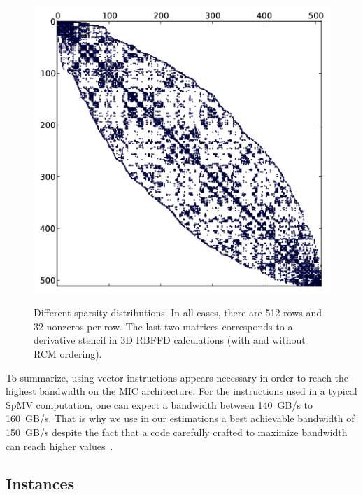 \documentclass{sig-alternate}
\begin{document}
\begin{figure}[t]
\begin{center}
{      \includegraphics[width=\ww]{figures/kd-tree-3d-rcm-crop.png}}%
  \end{center}
  
  \caption{Different sparsity distributions. In all cases, there are
    512 rows and 32 nonzeros per row. The last two matrices
    corresponds to a derivative stencil in 3D RBFFD
    calculations (with and without RCM ordering).}
  \label{fig:spy_plots}
\end{figure}

To summarize, using vector instructions appears necessary in order
to reach the highest bandwidth on the MIC architecture. For the instructions used
in a typical SpMV computation, one can expect a bandwidth between
140~GB/s to 160~GB/s. That is why we use in our estimations a best
achievable bandwidth of 150~GB/s despite the fact that a 
 code carefully crafted to maximize bandwidth can reach higher
values~\cite{Saule13-ARXIV}. 

\subsection{Instances}
\end{document}
